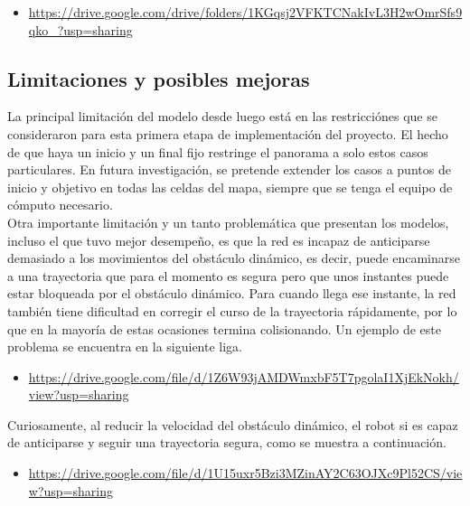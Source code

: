 \documentclass[spanish,mexico]{article}
\numberwithin{equation}{section}
\theoremstyle{definition}
\theoremstyle{remark}
\begin{document}
\begin{itemize}
\item \url{https://drive.google.com/drive/folders/1KGqsj2VFKTCNakIvL3H2wOmrSfs9qko_?usp=sharing}
\end{itemize}



\subsection{Limitaciones y posibles mejoras}
La principal limitación del modelo desde luego está en las restricciónes que se consideraron para esta primera etapa de implementación del proyecto. El hecho de que haya un inicio y un final fijo restringe el panorama a solo estos casos particulares. En futura investigación, se pretende extender los casos a puntos de inicio y objetivo en todas las celdas del mapa, siempre que se tenga el equipo de cómputo necesario.\\

Otra importante limitación y un tanto problemática que presentan los modelos, incluso el que tuvo mejor desempeño, es que la red es incapaz de anticiparse demasiado a los movimientos del obstáculo dinámico, es decir, puede encaminarse a una trayectoria que para el momento es segura pero que unos instantes puede estar bloqueada por el obstáculo dinámico. Para cuando llega ese instante, la red también tiene dificultad en corregir el curso de la trayectoria rápidamente, por lo que en la mayoría de estas ocasiones termina colisionando. Un ejemplo de este problema se encuentra en la siguiente liga.

\begin{itemize}
\item \url{https://drive.google.com/file/d/1Z6W93jAMDWmxbF5T7pgolaI1XjEkNokh/view?usp=sharing}
\end{itemize}

Curiosamente, al reducir la velocidad del obstáculo dinámico, el robot si es capaz de anticiparse y seguir una trayectoria segura, como se muestra a continuación.

\begin{itemize}
\item \url{https://drive.google.com/file/d/1U15uxr5Bzi3MZinAY2C63OJXc9Pl52CS/view?usp=sharing}
\end{itemize}
\end{document}
